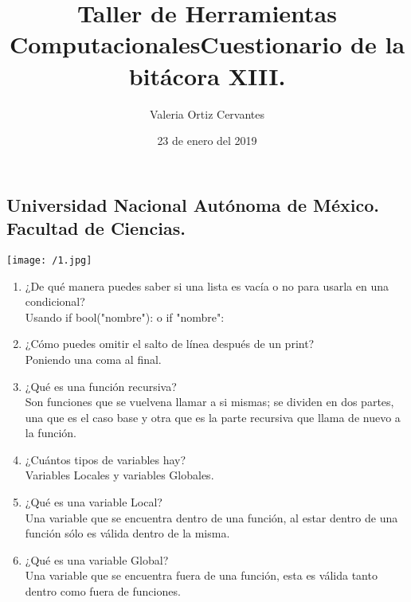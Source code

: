 \documentclass{article} %
\title{\Huge Taller de Herramientas Computacionales}
\author{\huge Valeria Ortiz Cervantes}
\date{\LARGE 23 de enero del 2019}
\begin{document}
\maketitle
\begin{center}
	\subsection*{\LARGE Universidad Nacional Autónoma de México.\\Facultad de Ciencias.\\}
	\texttt{[image: /1.jpg]}
\end{center}
\newpage
\title{\LARGE Cuestionario de la bitácora XIII.}
\begin{enumerate}
	\item ¿De qué manera puedes saber si una lista es vacía o no para usarla en una condicional?\\Usando if bool("nombre"): o if "nombre":
	\item ¿Cómo puedes omitir el salto de línea después de un print?\\Poniendo una coma al final.
	\item ¿Qué es una función recursiva?\\Son funciones que se vuelvena  llamar a si mismas; se dividen en dos partes, una que es el caso base y otra que es la parte recursiva que llama de nuevo a la función.
	\item ¿Cuántos tipos de variables hay?\\Variables Locales y variables Globales.
	\item ¿Qué es una variable Local?\\ Una variable que se encuentra dentro de una función, al estar dentro de una función sólo es válida dentro de la misma.
	\item ¿Qué es una variable Global?\\Una variable que se encuentra fuera de una función, esta es válida tanto dentro como fuera de funciones.
\end{enumerate}
\end{document}
